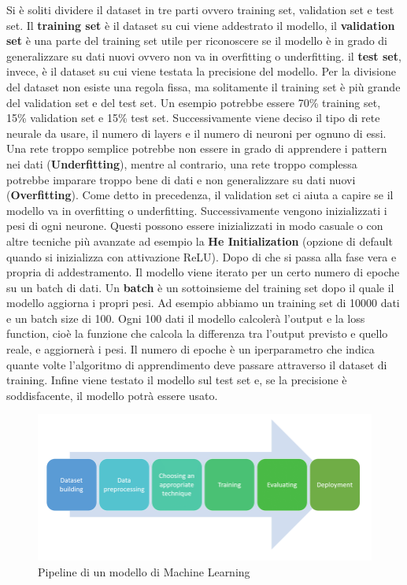 \documentclass[12pt,a4paper,openright,twoside]{book}
\begin{document}
Si è soliti dividere il dataset in tre parti ovvero training set, validation set e test set.
Il \textbf{training set} è il dataset su cui viene addestrato
il modello, il \textbf{validation set} è una parte del training set
utile per riconoscere se il modello è in grado di generalizzare
su dati nuovi ovvero non va in overfitting o underfitting.
il \textbf{test set}, invece, è il dataset
su cui viene testata la precisione del modello.
Per la divisione del dataset non esiste una regola fissa,
ma solitamente il training set è più grande del validation set
e del test set. Un esempio potrebbe essere 70\% training set, 15\% validation set
e 15\% test set.
Successivamente viene deciso il tipo di rete 
neurale da usare, il numero di layers e il numero
di neuroni per ognuno di essi. Una rete troppo semplice
potrebbe non essere in grado di apprendere i pattern
nei dati (\textbf{Underfitting}), mentre al contrario,
una rete troppo complessa potrebbe imparare
troppo bene di dati e non generalizzare su dati nuovi
(\textbf{Overfitting}). Come detto in precedenza, il validation
set ci aiuta a capire se il modello va in overfitting o underfitting.
Successivamente vengono inizializzati i pesi di ogni neurone.
Questi possono essere inizializzati in modo casuale
o con altre tecniche più avanzate ad esempio
la \textbf{He Initialization} \cite{he2015delving}
(opzione di default quando si inizializza 
con attivazione ReLU).
Dopo di che si passa alla fase vera e propria di addestramento.
Il modello viene iterato per un certo numero di epoche su un batch di dati.
Un \textbf{batch} è un sottoinsieme del training set dopo il quale il modello
aggiorna i propri pesi. Ad esempio abbiamo un training set di 10000 dati
e un batch size di 100. Ogni 100 dati il modello calcolerà
l'output e la loss function, cioè la funzione che calcola
la differenza tra l'output previsto e quello reale,
e aggiornerà i pesi.
Il numero di epoche è un iperparametro che indica quante volte
l'algoritmo di apprendimento deve passare attraverso il dataset di training\cite{brownlee2018difference}.
Infine viene testato il modello sul test set e, se la precisione
è soddisfacente, il modello potrà essere usato.
\begin{figure}
    \centering
    \includegraphics[width=.8\linewidth]{figures/Machine-learning-pipeline.png}
    \caption{Pipeline di un modello di Machine Learning \cite{phdthesishamza}}
    \label{fig:ML pipeline}
\end{figure}
\end{document}
